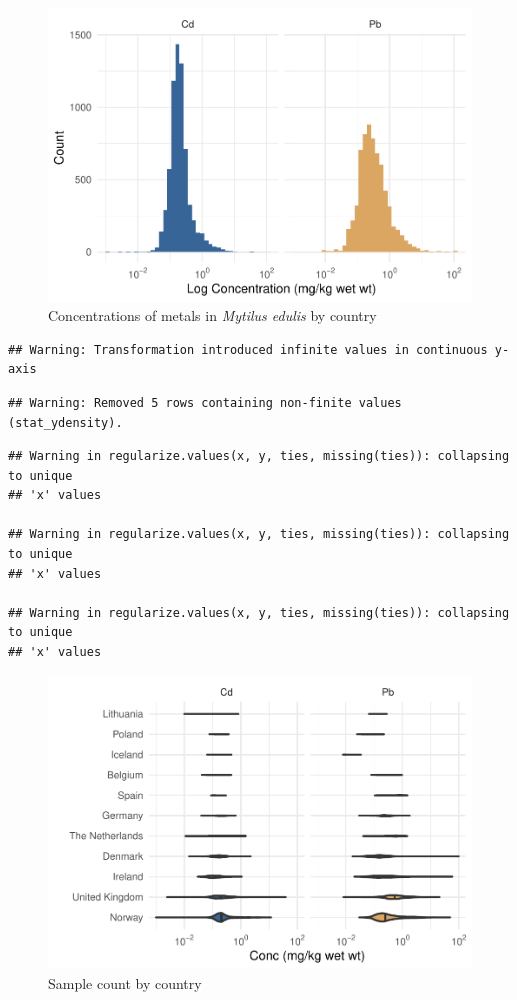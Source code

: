 \documentclass[
  12pt,
]{article}
\begin{document}
\begin{figure}
\centering
\includegraphics{McCrory_ENV972_Project_files/figure-latex/unnamed-chunk-4-1.pdf}
\caption{Concentrations of metals in \emph{Mytilus edulis} by country}
\end{figure}

\begin{verbatim}
## Warning: Transformation introduced infinite values in continuous y-axis
\end{verbatim}

\begin{verbatim}
## Warning: Removed 5 rows containing non-finite values (stat_ydensity).
\end{verbatim}

\begin{verbatim}
## Warning in regularize.values(x, y, ties, missing(ties)): collapsing to unique
## 'x' values

## Warning in regularize.values(x, y, ties, missing(ties)): collapsing to unique
## 'x' values

## Warning in regularize.values(x, y, ties, missing(ties)): collapsing to unique
## 'x' values
\end{verbatim}

\begin{figure}
\centering
\includegraphics{McCrory_ENV972_Project_files/figure-latex/unnamed-chunk-5-1.pdf}
\caption{Sample count by country}
\end{figure}
\end{document}
